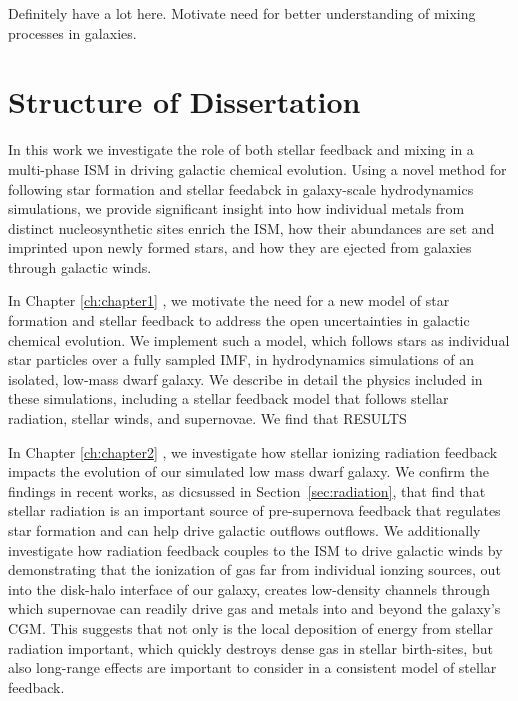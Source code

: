 Definitely have a lot here. Motivate need for better understanding of mixing processes in galaxies. \citep{SchonrichWeinberg2019}



%
%
%


\section{Structure of Dissertation}\label{sec:structure}

In this work we investigate the role of both stellar feedback and mixing in a multi-phase ISM in driving galactic chemical evolution. Using a novel method for following star formation and stellar feedabck in galaxy-scale hydrodynamics simulations, we provide significant insight into how individual metals from distinct nucleosynthetic sites enrich the ISM, how their abundances are set and imprinted upon newly formed stars, and how they are ejected from galaxies through galactic winds. 

In Chapter \ref{ch:chapter1} \citep[published as ][]{Emerick2019}, we motivate the need for a new model of star formation and stellar feedback to address the open uncertainties in galactic chemical evolution. We implement such a model, which follows stars as individual star particles over a fully sampled IMF, in hydrodynamics simulations of an isolated, low-mass dwarf galaxy. We describe in detail the physics included in these simulations, including a stellar feedback model that follows stellar radiation, stellar winds, and supernovae. We find that RESULTS

In Chapter \ref{ch:chapter2} \citep[published as ][]{Emerick2018a}, we investigate how stellar ionizing radiation feedback impacts the evolution of our simulated low mass dwarf galaxy. We confirm the findings in recent works, as dicsussed in Section~\ref{sec:radiation}, that find that stellar radiation is an important source of pre-supernova feedback that regulates star formation and can help drive galactic outflows outflows. We additionally investigate how radiation feedback couples to the ISM to drive galactic winds by demonstrating that the ionization of gas far from individual ionzing sources, out into the disk-halo interface of our galaxy, creates low-density channels through which supernovae can readily drive gas and metals into and beyond the galaxy's CGM. This suggests that not only is the local deposition of energy from stellar radiation important, which quickly destroys dense gas in stellar birth-sites, but also long-range effects are important to consider in a consistent model of stellar feedback.

